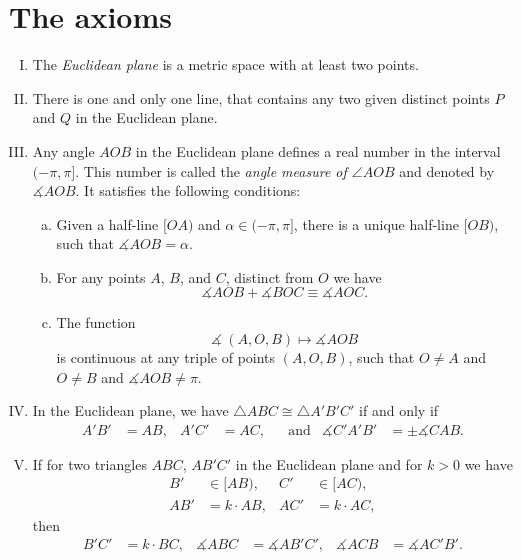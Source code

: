 \newpage

\section{The axioms}
\label{sec:axioms}


\begin{framed}
\begin{enumerate}[I.]
\item\label{def:birkhoff-axioms:0} The \emph{Euclidean plane} is a metric space with at least two points.


\item\label{def:birkhoff-axioms:1} 
There is one and only one line, that contains any two given distinct points $P$ and $Q$ in the Euclidean plane.

\item\label{def:birkhoff-axioms:2} 
Any angle $AOB$ in the Euclidean plane 
defines a real number in the interval $(-\pi,\pi]$.
This number is called the \emph{angle measure of $\angle AOB$}
and denoted by $\measuredangle A O B$.
It satisfies the following conditions:
\begin{enumerate}[(a)]
\item\label{def:birkhoff-axioms:2a} 
Given a half-line $[O A)$ and $\alpha\in(-\pi,\pi]$, 
there is a unique  half-line $[O B)$, 
such that $\measuredangle A O B= \alpha$.
\item\label{def:birkhoff-axioms:2b} 
For any points $A$, $B$, and $C$, distinct from $O$ we have
$$\measuredangle A O B+\measuredangle B O C
\equiv\measuredangle A O C.$$
\item\label{def:birkhoff-axioms:2c} 
The function 
$$\measuredangle\:(A,O,B)\mapsto\measuredangle A O B$$
is continuous at any triple of points $(A,O,B)$,
such that $O\ne A$ and $O\ne B$ and $\measuredangle A O B\ne\pi$.

\end{enumerate}

\item\label{def:birkhoff-axioms:3}  
In the Euclidean plane, we have
$\triangle A B C\cong\triangle A' B' C'$
if and only if 
\begin{align*}
A' B'&=A B, & A' C'&= A C, &&\text{and}
&\measuredangle C' A' B'&=\pm\measuredangle C A B.
\end{align*}
\item\label{def:birkhoff-axioms:4}
If for two triangles $ABC$, $AB'C'$ in the Euclidean plane
and for $k>0$ we have
\begin{align*}
B'&\in [AB),
& C'&\in [AC),
\\
AB'&=k\cdot AB,&
AC'&=k\cdot AC,
\end{align*}
then
\begin{align*}
B'C'&=k\cdot BC,&
\measuredangle ABC&=\measuredangle AB'C',
&
\measuredangle ACB&=\measuredangle AC'B'.
\end{align*}
\end{enumerate}
\end{framed}

